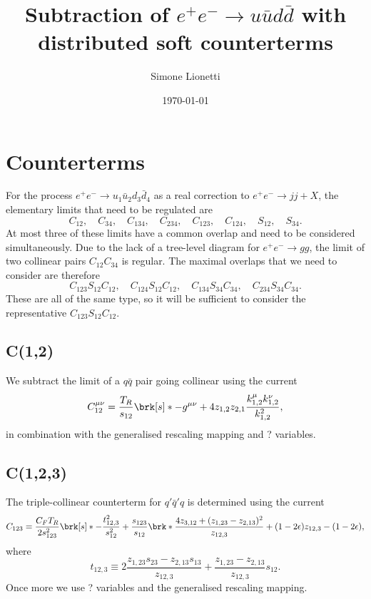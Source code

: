 \documentclass[11pt,a4paper]{article}
\title{Subtraction of $e^+e^- \to u\bar{u}d\bar{d}$
with distributed soft counterterms}
\author{Simone Lionetti}
\date{\today}
\newcommand{\eps}[0]{\epsilon}
\begin{document}
\maketitle

\section{Counterterms}

For the process $e^+e^- \to u_1\bar{u}_2d_3\bar{d}_4$
as a real correction to $e^+e^- \to jj+X$,
the elementary limits that need to be regulated are
\begin{equation}
	C_{12}, \quad C_{34}, \quad
	C_{134}, \quad C_{234}, \quad C_{123}, \quad C_{124}, \quad
	S_{12}, \quad S_{34}.
\end{equation}
At most three of these limits have a common overlap
and need to be considered simultaneously.
Due to the lack of a tree-level diagram for $e^+e^- \to gg$,
the limit of two collinear pairs $C_{12}C_{34}$ is regular.
The maximal overlaps that we need to consider are therefore
\begin{equation}
	C_{123}S_{12}C_{12}, \quad
	C_{124}S_{12}C_{12}, \quad
	C_{134}S_{34}C_{34}, \quad
	C_{234}S_{34}C_{34}.
\end{equation}
These are all of the same type,
so it will be sufficient to consider the representative $C_{123}S_{12}C_{12}$.

\subsection{C(1,2)}
We subtract the limit of a $q\bar{q}$ pair going collinear using the current
\begin{equation}
	C_{12}^{\mu\nu} = \frac{T_R}{s_{12}} \brk[s]*{
		- g^{\mu\nu}
		+ 4 z_{1,2} z_{2,1} \frac{k_{1,2}^\mu k_{1,2}^\nu}{k_{1,2}^2}
	},
\end{equation}
in combination with the generalised rescaling mapping
and ? variables.

\subsection{C(1,2,3)}

The triple-collinear counterterm for $q'\bar{q}'q$
is determined using the current \cite{Catani:1999ss}
\begin{equation}
	C_{123} = \frac{C_F T_R}{2 s_{123}^2} \brk[s]*{
		- \frac{t_{12,3}^2}{s_{12}^2}
		+ \frac{s_{123}}{s_{12}} \brk*{
			\frac{4 z_{3,12} + (z_{1,23} - z_{2,13})^2}{z_{12,3}}
			+(1 - 2\eps) z_{12,3}
		}
		- (1 - 2\eps)
	},
\end{equation}
where
\begin{equation}
	t_{12,3}
	\equiv 2 \frac{z_{1,23} s_{23} - z_{2,13} s_{13}}{z_{12,3}}
	+ \frac{z_{1,23} - z_{2,13}}{z_{12,3}} s_{12}.
\end{equation}
Once more we use ? variables and the generalised rescaling mapping.
\end{document}
